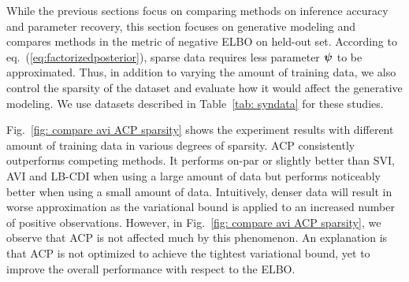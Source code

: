 While the previous sections focus on comparing methods on inference accuracy and parameter recovery, this section focuses on generative modeling and compares methods in the metric of negative ELBO on held-out set. 
According to eq.~(\ref{eq:factorizedposterior}), sparse data requires less parameter $\bm{\psi}$ to be approximated. Thus, in addition to varying the amount of training data,  we also control the sparsity of the dataset and evaluate how it would affect the generative modeling. %
We use \sparse datasets described in Table~\ref{tab: syndata} for these studies.



Fig.~\ref{fig: compare avi ACP sparsity} shows the experiment results with different amount of training data in various degrees of sparsity. ACP consistently outperforms competing methods. It performs on-par or slightly better than SVI, AVI and LB-CDI when using a large amount of data but performs noticeably better when using a small amount of data. 
Intuitively, denser data will result in worse approximation as the variational bound is applied to an increased number of positive observations.
However, in Fig.~\ref{fig: compare avi ACP sparsity}, we observe that ACP is not affected much by this phenomenon. An explanation is that ACP is not optimized to achieve the tightest variational bound, yet to improve the overall performance with respect to the ELBO. 

